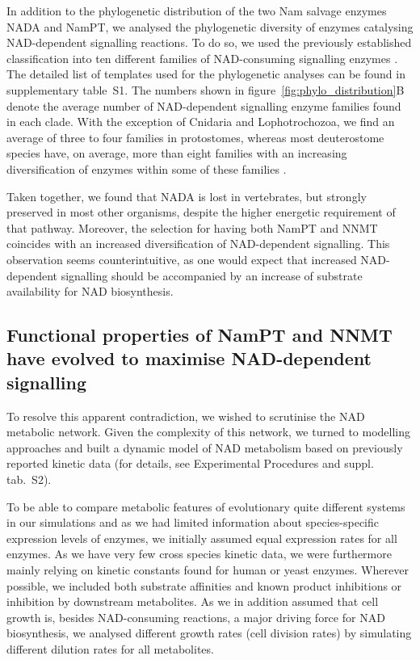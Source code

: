 In addition to the phylogenetic distribution of the two Nam salvage enzymes NADA and NamPT, we analysed the phylogenetic diversity of enzymes catalysing NAD-dependent signalling reactions. To do so, we used the previously established classification into ten different families of NAD-consuming signalling enzymes \cite{Gossmann2012FEBS}. The detailed list of templates used for the phylogenetic analyses can be found in supplementary table~S1. The numbers shown in figure~\ref{fig:phylo_distribution}B denote the average number of NAD-dependent signalling enzyme families found in each clade. With the exception of Cnidaria and Lophotrochozoa, we find an average of three to four families in protostomes, whereas most deuterostome species have, on average, more than eight families with an increasing diversification of enzymes within some of these families \cite{Gossmann2014DNAR}.

Taken together, we found that NADA is lost in vertebrates, but strongly preserved in most other organisms, despite the higher energetic requirement of that pathway. Moreover, the selection for having both NamPT and NNMT coincides with an increased diversification of NAD-dependent signalling. This observation seems counterintuitive, as one would expect that increased NAD-dependent signalling should be accompanied by an increase of substrate availability for NAD biosynthesis.


\subsection{Functional properties of NamPT and NNMT have evolved to maximise NAD-dependent signalling}

To resolve this apparent contradiction, we wished to scrutinise the NAD metabolic network. Given the complexity of this network, we turned to modelling approaches and built a dynamic model of NAD metabolism based on previously reported kinetic data (for details, see Experimental Procedures and suppl. tab.~S2).

To be able to compare metabolic features of evolutionary quite different systems in our simulations and as we had limited information about species-specific expression levels of enzymes, we initially assumed equal expression rates for all enzymes. As we have very few cross species kinetic data, we were furthermore mainly relying on kinetic constants found for human or yeast enzymes. Wherever possible, we included both substrate affinities and known product inhibitions or inhibition by downstream metabolites. As we in addition assumed that cell growth is, besides NAD-consuming reactions, a major driving force for NAD biosynthesis, we analysed different growth rates (cell division rates) by simulating different dilution rates for all metabolites.

